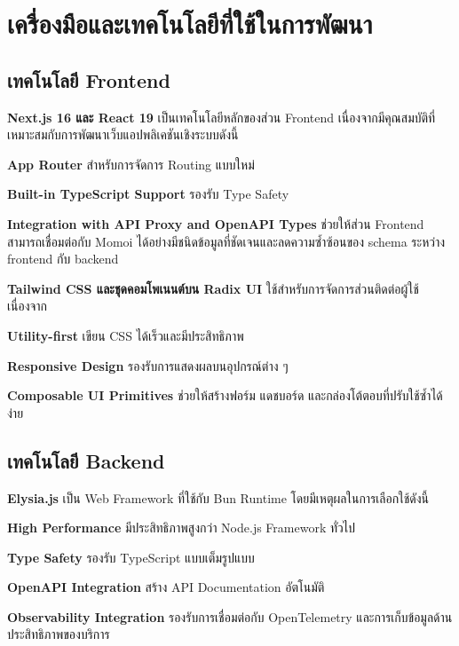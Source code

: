 \section{เครื่องมือและเทคโนโลยีที่ใช้ในการพัฒนา}

\subsection{เทคโนโลยี Frontend}

\hspace*{1.3em} %
\textbf{Next.js 16 และ React 19} เป็นเทคโนโลยีหลักของส่วน Frontend เนื่องจากมีคุณสมบัติที่เหมาะสมกับการพัฒนาเว็บแอปพลิเคชันเชิงระบบดังนี้
\begin{mycustomitem}
    \item \textbf{App Router} สำหรับการจัดการ Routing แบบใหม่
    \item \textbf{Built-in TypeScript Support} รองรับ Type Safety
    \item \textbf{Integration with API Proxy and OpenAPI Types} ช่วยให้ส่วน Frontend สามารถเชื่อมต่อกับ Momoi ได้อย่างมีชนิดข้อมูลที่ชัดเจนและลดความซ้ำซ้อนของ schema ระหว่าง frontend กับ backend
\end{mycustomitem}

\newpage
\hspace*{1.3em} %
\textbf{Tailwind CSS และชุดคอมโพเนนต์บน Radix UI} ใช้สำหรับการจัดการส่วนติดต่อผู้ใช้ เนื่องจาก
\begin{mycustomitem}
    \item \textbf{Utility-first} เขียน CSS ได้เร็วและมีประสิทธิภาพ
    \item \textbf{Responsive Design} รองรับการแสดงผลบนอุปกรณ์ต่าง ๆ
    \item \textbf{Composable UI Primitives} ช่วยให้สร้างฟอร์ม แดชบอร์ด และกล่องโต้ตอบที่ปรับใช้ซ้ำได้ง่าย
\end{mycustomitem}

\subsection{เทคโนโลยี Backend}

\hspace*{1.3em} %
\textbf{Elysia.js} เป็น Web Framework ที่ใช้กับ Bun Runtime โดยมีเหตุผลในการเลือกใช้ดังนี้
\begin{mycustomitem}
    \item \textbf{High Performance} มีประสิทธิภาพสูงกว่า Node.js Framework ทั่วไป
    \item \textbf{Type Safety} รองรับ TypeScript แบบเต็มรูปแบบ
    \item \textbf{OpenAPI Integration} สร้าง API Documentation อัตโนมัติ
    \item \textbf{Observability Integration} รองรับการเชื่อมต่อกับ OpenTelemetry และการเก็บข้อมูลด้านประสิทธิภาพของบริการ
\end{mycustomitem}

